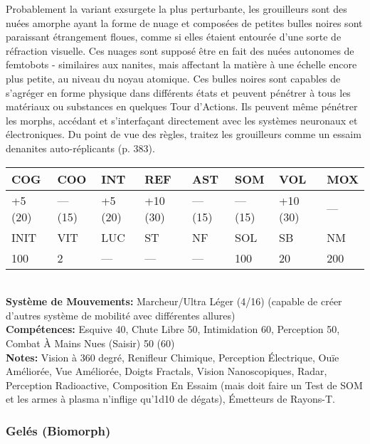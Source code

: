 Probablement la variant exsurgete la plus perturbante, les grouilleurs sont des nuées amorphe ayant la forme de nuage et composées de petites bulles noires sont paraissant étrangement floues, comme si elles étaient entourée d'une sorte de réfraction visuelle. Ces nuages sont supposé être en fait des nuées autonomes de femtobots - similaires aux nanites, mais affectant la matière à une échelle encore plus petite, au niveau du noyau atomique. Ces bulles noires sont capables de s'agréger en forme physique dans différents états et peuvent pénétrer à tous les matériaux ou substances en quelques Tour d'Actions. Ils peuvent même pénétrer les morphs, accédant et s'interfaçant directement avec les systèmes neuronaux et électroniques. Du point de vue des règles, traitez les grouilleurs comme un essaim denanites auto-réplicants (p. 383).\\ \begin{tabular}{|l|l|l|l|l|l|l|l|} \hline

COG &COO &INT &REF &AST &SOM &VOL &MOX \\ \hline

+5 (20) &— (15) &+5 (20) &+10 (30) &— (15) &— (15) &+10 (30) &— \\ \hline

INIT &VIT &LUC &ST &NF &SOL &SB &NM \\ \hline

100 &2 &— &— &— &100 &20 &200 \\ \hline

\end{tabular} \\ \textbf{Système de Mouvements: }Marcheur/Ultra Léger (4/16) (capable de créer d'autres système de mobilité avec différentes allures) \\ \textbf{Compétences:} Esquive 40, Chute Libre 50, Intimidation 60, Perception 50, Combat À Mains Nues (Saisir) 50 (60) \\ \textbf{Notes: }Vision à 360 degré, Renifleur Chimique, Perception Électrique, Ouïe Améliorée, Vue Améliorée, Doigts Fractals, Vision Nanoscopiques, Radar, Perception Radioactive, Composition En Essaim (mais doit faire un Test de SOM et les armes à plasma n'inflige qu'1d10 de dégats), Émetteurs de Rayons-T. 







\subsubsection{Gelés (Biomorph)} 

